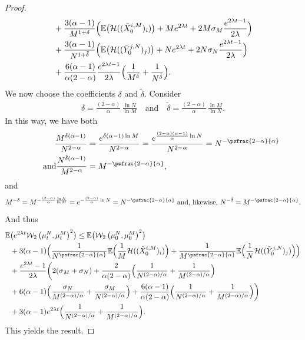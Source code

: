\begin{proof}
\begin{align*}
&+\frac{3(\alpha-1)}{M^{1+\delta}}\Bigl(\mathbb{E}\bigl(\mathcal{H}((\tilde{X}^{i,M}_0)_{i})\bigr)+Me^{2\lambda t}+2M\sigma_M\frac{e^{2\lambda t-1}}{2\lambda}\Bigr)\\
&+\frac{3(\alpha-1)}{N^{1+\tilde{\delta}}}\Bigl(\mathbb{E}\bigl(\mathcal{H}((\tilde{Y}^{j,N}_0)_{j})\bigr)+Ne^{2\lambda t}+2N\sigma_N\frac{e^{2\lambda t-1}}{2\lambda}\Bigr)\\
&+\frac{6(\alpha-1)}{\alpha(2-\alpha) }\frac{e^{2\lambda t-1}}{2\lambda}\Bigl(\frac{1}{M^{\delta}}+\frac{1}{N^{\tilde{\delta}}}\Bigr).
\end{align*}
We now choose the coefficients $\delta$ and $\tilde{\delta}$. Consider
\begin{align*}
\delta=\frac{(2-\alpha)}{\alpha}\,\frac{\ln N}{\ln M}\quad\text{and}\quad \tilde{\delta}=\frac{(2-\alpha)}{\alpha}\,\frac{\ln M}{\ln N}.
\end{align*}
In this way, we have both
\begin{align*}
\frac{M^{\delta(\alpha-1)}}{N^{2-\alpha}}&=\frac{e^{\delta(\alpha-1)\ln M}}{N^{2-\alpha}}=\frac{e^{\frac{(2-\alpha)(\alpha-1)}{\alpha}\ln N}}{N^{2-\alpha}}=N^{-\psfrac{2-\alpha}{\alpha}}\\
\tag*{and}
\frac{N^{\tilde{\delta}(\alpha-1)}}{M^{2-\alpha}}&=M^{-\psfrac{2-\alpha}{\alpha}},
\end{align*}
and
\[
M^{-\delta}=M^{-\frac{(2-\alpha)}{\alpha}\frac{\ln N}{\ln M}}=e^{-\frac{(2-\alpha)}{\alpha}\ln N}=N^{-\psfrac{2-\alpha}{\alpha}}\text{ and, likewise, }N^{-\tilde{\delta}}=M^{-\psfrac{2-\alpha}{\alpha}}.
\]
And thus
\begin{align*}
\mathbb{E}&\bigl(e^{2\lambda t}\mathcal{W}_2\left(\mu_t^N,\mu_t^M\right)^2\bigr)\leq \mathbb{E}\bigl(\mathcal{W}_2\left(\mu_0^N,\mu_0^M\right)^2\bigr)\\
&+3(\alpha-1)\Bigl(\frac{1}{N^{\psfrac{2-\alpha}{\alpha}}}\mathbb{E}\Bigl(\frac{1}{M}\mathcal{H}((\tilde{X}^{i,M}_0)_{i})\Bigr)+\frac{1}{M^{\psfrac{2-\alpha}{\alpha}}}\mathbb{E}\Bigl(\frac{1}{N}\mathcal{H}((\tilde{Y}^{j,N}_0)_{j})\Bigr)\Bigr)\\
&+\frac{e^{2\lambda t}-1}{2\lambda}\biggl(2(\sigma_M+\sigma_N)+\frac{2}{\alpha(2-\alpha)}\Bigl(\frac{1}{N^{(2-\alpha)/\alpha}}+\frac{1}{M^{(2-\alpha)/\alpha}}\Bigr)\\
&+6(\alpha-1)\Bigl(\frac{\sigma_N}{M^{(2-\alpha)/\alpha}}+\frac{\sigma_M}{N^{(2-\alpha)/\alpha}}\Bigr)+\frac{6(\alpha-1)}{\alpha(2-\alpha)}\Bigl(\frac{1}{N^{(2-\alpha)/\alpha}}+\frac{1}{M^{(2-\alpha)/\alpha}}\Bigr)\biggr)\\
&+3(\alpha-1)e^{2\lambda t}\Bigl(\frac{1}{N^{(2-\alpha)/\alpha}}+\frac{1}{M^{(2-\alpha)/\alpha}}\Bigr).
\end{align*}
This yields the result.
\end{proof}

